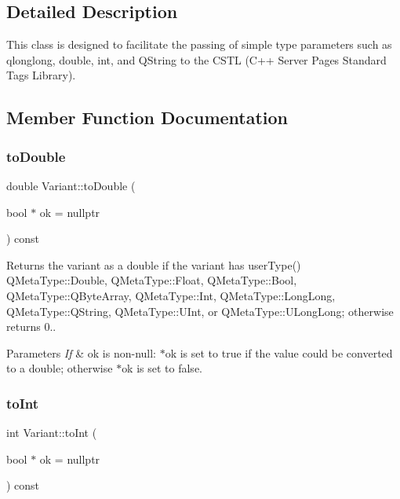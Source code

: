 \subsection{Detailed Description}
This class is designed to facilitate the passing of simple type parameters such as qlonglong, double, int, and Q\+String to the C\+S\+TL (C++ Server Pages Standard Tags Library). 

\subsection{Member Function Documentation}
\mbox{\label{class_variant_a543a5e6579cea7fcd8e6413921e8fd44}} 
\subsubsection{\texorpdfstring{to\+Double}{toDouble}}
{\footnotesize\ttfamily double Variant\+::to\+Double (\begin{DoxyParamCaption}\item[{bool $\ast$}]{ok = {\ttfamily nullptr} }\end{DoxyParamCaption}) const\hspace{0.3cm}{\ttfamily [slot]}}



Returns the variant as a double if the variant has user\+Type() Q\+Meta\+Type\+::\+Double, Q\+Meta\+Type\+::\+Float, Q\+Meta\+Type\+::\+Bool, Q\+Meta\+Type\+::\+Q\+Byte\+Array, Q\+Meta\+Type\+::\+Int, Q\+Meta\+Type\+::\+Long\+Long, Q\+Meta\+Type\+::\+Q\+String, Q\+Meta\+Type\+::\+U\+Int, or Q\+Meta\+Type\+::\+U\+Long\+Long; otherwise returns 0.. 


\begin{DoxyParams}{Parameters}
{\em If} & ok is non-\/null\+: $\ast$ok is set to true if the value could be converted to a double; otherwise $\ast$ok is set to false. \\
\hline
\end{DoxyParams}
\mbox{\label{class_variant_ae38d113834d5d53ca9c7f36366a25288}} 
\subsubsection{\texorpdfstring{to\+Int}{toInt}}
{\footnotesize\ttfamily int Variant\+::to\+Int (\begin{DoxyParamCaption}\item[{bool $\ast$}]{ok = {\ttfamily nullptr} }\end{DoxyParamCaption}) const\hspace{0.3cm}{\ttfamily [slot]}}



